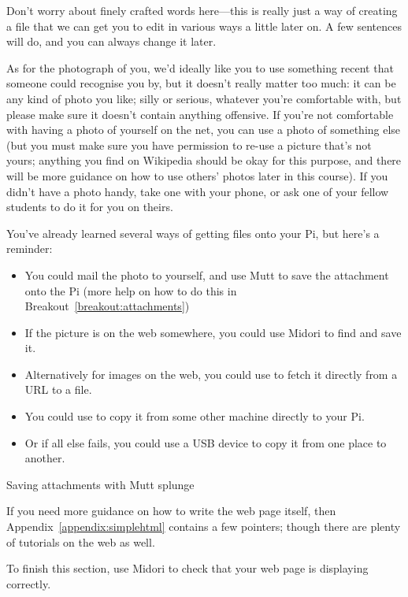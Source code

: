 Don't worry about finely crafted words here---this is really just a way of creating a file that we can get you to edit in various ways a little later on. A few sentences will do, and you can always change it later. 

As for the photograph of you, we'd ideally like you to use something recent that someone could recognise you by, but it doesn't really matter too much: it can be any kind of photo you like; silly or serious, whatever you're comfortable with, but please make sure it doesn't contain anything offensive. If you're not comfortable with having a photo of yourself on the net, you can use a photo of something else (but you must make sure you have permission to re-use a picture that's not yours; anything you find on Wikipedia should be okay for this purpose, and there will be more guidance on how to use others' photos later in this course). If you didn't have a photo handy, take one with your phone, or ask one of your fellow students to do it for you on theirs.

You've already learned several ways of getting files onto your Pi, but here's a reminder:
\begin{itemize}
\item You could mail the photo to yourself, and use Mutt to save the attachment onto the Pi (more help on how to do this in Breakout~\ref{breakout:attachments})
\item If the picture is on the web somewhere, you could use Midori to find and save it. 
\item Alternatively for images on the web, you could use  to fetch it directly from a URL to a file. 
\item You could use  to copy it from some other machine directly to your Pi. 
\item Or if all else fails, you could use a USB device to copy it from one place to another. 
\end{itemize}

\begin{diversion}{Saving attachments with Mutt}
\label{breakout:attachments}
splunge
\end{diversion}

If you need more guidance on how to write the web page itself, then Appendix~\ref{appendix:simplehtml} contains a few pointers; though there are plenty of tutorials on the web as well. 

To finish this section, use Midori to check that your web page is displaying correctly.

